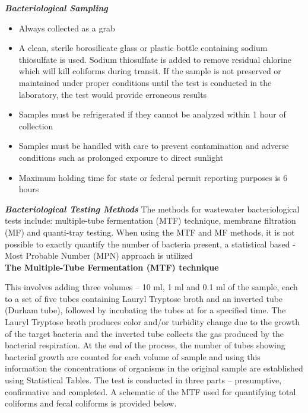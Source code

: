 \textbf{\textit{Bacteriological Sampling}}

\begin{itemize}
\item Always collected as a grab
\item A clean, sterile borosilicate glass or plastic bottle containing sodium thiosulfate is used. Sodium thiosulfate is added to remove residual chlorine which will kill coliforms during transit. If the sample is not preserved or maintained under proper conditions until the test is conducted in the laboratory, the test would provide erroneous results
\item Samples must be refrigerated if they cannot be analyzed within 1 hour of collection
\item Samples must be handled with care to prevent contamination and adverse conditions such as prolonged exposure to direct sunlight
\item Maximum holding time for state or federal permit reporting purposes is 6 hours
\end{itemize}  


\textbf{\textit{Bacteriological Testing Methods}}
The methods for wastewater bacteriological tests include:  multiple-tube fermentation (MTF) technique, membrane filtration (MF) and quanti-tray testing.  When using the MTF and MF methods, it is not possible to exactly quantify the number of bacteria present, a statistical based - Most Probable Number (MPN) approach is utilized\\

\textbf{The Multiple-Tube Fermentation (MTF) technique}

This involves adding three volumes – 10 ml, 1 ml and 0.1 ml of the sample, each to a set of five tubes containing Lauryl Tryptose broth and an inverted tube (Durham tube), followed by incubating the tubes at  for a specified time.  The Lauryl Tryptose broth produces color and/or turbidity change due to the growth of the target bacteria and the inverted tube collects the gas produced by the bacterial respiration.  At the end of the process, the number of tubes showing bacterial growth are counted for each volume of sample and using this information the concentrations of organisms in the original sample are established using Statistical Tables.  The test is conducted in three parts – presumptive, confirmative and completed.  A schematic of the MTF used for quantifying total coliforms and fecal coliforms is provided below.\\
\newpage
\thispagestyle{empty}


\newpage


